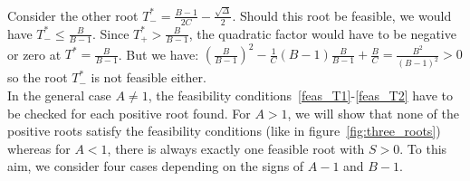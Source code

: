 \documentclass[a4paper, 12pt]{article}
\begin{document}
 Consider the other root $T_-^* = \frac{B-1}{2C} - \frac{\sqrt{\Delta}}{2}$.
 Should this root be feasible, we would have $ T_-^* \leq \frac{B}{B-1}$. Since $T_+^* > \frac{B}{B-1}$, the quadratic factor would have to be negative or zero at $T^* = \frac{B}{B-1}$. But we have: ${\left(\frac{B}{B-1}\right)}^2 - \frac{1}{C} (B - 1) \frac{B}{B-1} + \frac{B}{C} = \frac{B^2}{{(B-1)}^2} > 0$ so the root $T_-^*$ is not feasible either.  
\bigskip\\
In the general case $A \neq 1$, the feasibility conditions~\eqref{feas_T1}-\eqref{feas_T2} have to be checked for each positive root found. 
For $A>1$, we will show that none of the positive roots satisfy the feasibility conditions (like in figure~\ref{fig:three_roots}) whereas for $A<1$, there is always exactly one feasible root with $S>0$. 
To this aim, we consider four cases  depending on the signs of $A - 1$ and $B - 1$.
\end{document}
